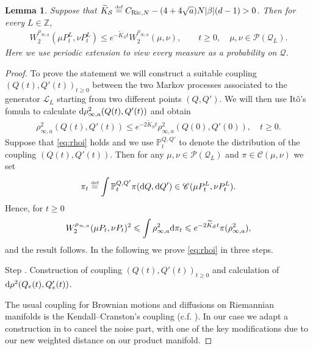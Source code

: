 \documentclass[11pt,UTF-8,reqno]{amsart}
\numberwithin{equation}{section}
\newtheorem{lemma}[theorem]{Lemma}
\def\Ric{{\rm Ricci}}
\def\dif{{\mathord{{\rm d}}}}
\newcommand{\eqdef}{\stackrel{\mbox{\tiny def}}{=}}
\def\cL{{\mathcal L}}
\def\cQ{{\mathcal Q}}
\def\cS{{\mathcal S}}
\def\mP{{\mathbb P}}
\def\mZ{{\mathbb Z}}
\def\sC{{\mathscr C}}
\def\sP{{\mathscr P}}
\def\geq{\geqslant}
\def\leq{\leqslant}
\def\Ric{{\rm Ric}}
\def\dif{{\mathord{{\rm d}}}}
\def\bl{\begin{lemma}}
\def\el{\end{lemma}}
\def\geq{\geqslant}
\def\leq{\leqslant}
\begin{document}
\bl\label{lem:4.6}
Suppose that $\widetilde K_\cS\eqdef C_{\Ric,N}-{(4+4\sqrt{a})}N|\beta|(d-1)>0$.
Then for every $L\in \mZ$,
\begin{align*}
	W_2^{\rho_{\infty,a}}(\mu P_t^L,\nu P_t^L)\leq e^{-\widetilde K_\cS t}W_2^{\rho_{\infty,a}}(\mu,\nu),\qquad t\geq0, \quad\mu, \nu\in \sP(\cQ_L).
\end{align*}
Here we  use periodic extension to view every measure as a probability on $\cQ$.
\el
\begin{proof}
To prove the statement we will construct a suitable coupling $(Q(t),Q'(t))_{t\geq0}$ between the two Markov processes associated to the generator $\cL_L$ starting from two different points $(Q,Q')$.
We will then use It\^o's fomula to calculate $\dif \rho_{\infty,a}^2(Q(t),Q'(t))$ and obtain
	\begin{align}\label{eq:rhoi}
		\rho_{\infty,a}^2(Q(t),Q'(t))\leq e^{-2\tilde{K}_St}\rho_{\infty,a}^2(Q(0),Q'(0)),\quad t\geq0.
	\end{align}
	Suppose that \eqref{eq:rhoi} holds and we use $\mP_t^{Q,Q'}$ to denote
	the distribution of the coupling $(Q(t),Q'(t))$. Then for any $\mu,\nu\in \sP(\cQ_L)$ and $\pi\in \sC(\mu,\nu)$ we set
	\begin{align*}
		\pi_t\eqdef \int \mP_t^{Q,Q'}\pi(\dif Q,\dif Q')\in \sC (\mu P_t^L,\nu P_t^L).
	\end{align*}
	Hence, for $t\geq0$
	\begin{align*}
		W_2^{\rho_{\infty,a}}(\mu P_t,\nu P_t)^2\leq \int\rho_{\infty,a}^2\dif \pi_t \leq e^{-2\widetilde{K}_{\cS} t}\pi(\rho_{\infty,a}^2),
	\end{align*}
	and the result follows.
In the following we prove \eqref{eq:rhoi} in three steps.


\medskip

{\sc Step} .\label{MM1} Construction of coupling $(Q(t),Q'(t))_{t\geq 0}$ and calculation of $\dif \rho^2(Q_e(t),Q'_e(t))$.

 The usual coupling for Brownian motions and diffusions  on  Riemannian manifolds
  is the Kendall--Cranston's coupling (c.f. \cite{Ken86}). In our case
  we adapt a construction in  \cite[Proposition~2.5.1]{Wang} to cancel the noise part,
 with one of the key modifications  due to our new weighted distance on our product manifold.


\end{proof}
\end{document}

